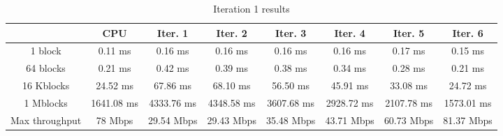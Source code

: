 \begin{table}
	\caption{Iteration 1 results}
	\centering
	\begin{tabular}{cccccccc}
		\toprule
		 & CPU & Iter. 1 & Iter. 2 & Iter. 3 & Iter. 4 & Iter. 5 & Iter. 6 \\
		\midrule
		1 block & 0.11 ms & 0.16 ms & 0.16 ms & 0.16 ms & 0.16 ms & 0.17 ms & 0.15 ms \\
		64 blocks & 0.21 ms & 0.42 ms & 0.39 ms & 0.38 ms & 0.34 ms & 0.28 ms & 0.21 ms \\
		16 Kblocks & 24.52 ms & 67.86 ms & 68.10 ms & 56.50 ms & 45.91 ms & 33.08 ms & 24.72 ms \\
		1 Mblocks & 1641.08 ms & 4333.76 ms & 4348.58 ms & 3607.68 ms & 2928.72 ms & 2107.78 ms & 1573.01 ms \\
		Max throughput & 78 Mbps & 29.54 Mbps & 29.43 Mbps & 35.48 Mbps & 43.71 Mbps & 60.73 Mbps & 81.37 Mbps \\
		\bottomrule
	\end{tabular}
\end{table}
